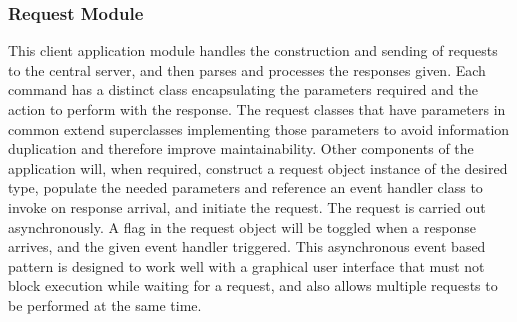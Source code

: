 \subsubsection{Request Module}
This client application module handles the construction and sending of requests to the central server, and then parses and processes the responses given. Each command has a distinct class encapsulating the parameters required and the action to perform with the response. The request classes that have parameters in common extend superclasses implementing those parameters to avoid information duplication and therefore improve maintainability. Other components of the application will, when required, construct a request object instance of the desired type, populate the needed parameters and reference an event handler class to invoke on response arrival, and initiate the request. The request is carried out asynchronously. A flag in the request object will be toggled when a response arrives, and the given event handler triggered. This asynchronous event based pattern is designed to work well with a graphical user interface that must not block execution while waiting for a request, and also allows multiple requests to be performed at the same time.

